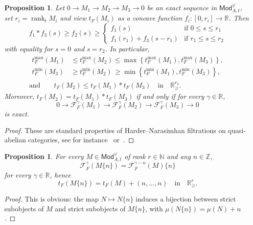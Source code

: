 \documentclass[11pt]{article}
\newtheorem{prop}[theo]{Proposition}
\theoremstyle{definition}
\numberwithin{equation}{section}
\numberwithin{figure}{section}
\numberwithin{table}{section}
\newcommand{\Mod}{\mathsf{Mod}}
\DeclareMathOperator{\rank}{rank}
\begin{document}
\begin{prop}\label{prop:ExactSeqInModt}
Let $0\rightarrow M_{1}\rightarrow M_{2}\rightarrow M_{3}\rightarrow0$ be an exact sequence in $\Mod_{A,t}^{\varphi}$, set $r_{i}=\rank_{t}M_{i}$ and view $t_{F}(M_{i})$ as a concave function $f_{i}:[0,r_{i}]\rightarrow\mathbb{R}$. Then
\[
f_{1}\ast f_{3}(s)\geq f_{2}(s)\geq
\begin{cases}
f_{1}(s) & \text{if }0\leq s\leq r_{1}\\
f_{1}(r_{1})+f_{3}(s-r_{1}) & \text{if }r_{1}\leq s\leq r_{2}
\end{cases}
\]
with equality for $s=0$ and $s=r_{2}$. In particular,
\begin{gather*}
\begin{aligned}
t_{F}^{\max}(M_{1}) & \leq t_{F}^{\max}(M_{2}) \leq \max\left\{ t_{F}^{\max}(M_{1}),t_{F}^{\max}(M_{3})\right\},\\
t_{F}^{\min}(M_{3}) & \geq t_{F}^{\min}(M_{2})\, \geq \min\left\{ t_{F}^{\min}(M_{1}),t_{F}^{\min}(M_{3})\right\},
\end{aligned}
\\
\text{and}\qquad t_{F}(M_{2})\leq t_{F}(M_{1})\ast t_{F}(M_{3})\quad\text{in}\quad\mathbb{R}_{\geq}^{r_{2}}.
\end{gather*}
Moreover, $t_{F}(M_{2})=t_{F}(M_{1})\ast t_{F}(M_{3})$ if and only if for every $\gamma\in\mathbb{R}$,
\[
0\rightarrow\mathcal{F}_{F}^{\gamma}(M_{1})\rightarrow\mathcal{F}_{F}^{\gamma}(M_{2})\rightarrow\mathcal{F}_{F}^{\gamma}(M_{3})\rightarrow0
\]
is exact.
\end{prop}

\begin{proof}
These are standard properties of Harder--Narasimhan filtrations on quasi-abelian categories, see for instance~\cite[Proposition~21]{Co16} or~\cite[4.4.4]{An09}.
\end{proof}

\begin{prop}\label{prop:tF(twist)onModt}
For every $M\in\Mod_{A,t}^{\varphi}$ of rank $r\in\mathbb{N}$ and any $n\in\mathbb{Z}$,
\[
\mathcal{F}_{F}^{\gamma}(M\{n\})=\mathcal{F}_{F}^{\gamma-n}(M)\{n\}
\]
for every $\gamma\in\mathbb{R}$, hence
\[
t_{F}(M\{n\})=t_{F}(M)+(n,\dots,n)\quad\text{in}\quad\mathbb{R}_{\geq}^{r}.
\]
\end{prop}

\begin{proof}
This is obvious: the map $N\mapsto N\{n\}$ induces a bijection between strict subobjects of $M$ and strict subobjects of $M\{n\}$, with $\mu(N\{n\})=\mu(N)+n$.
\end{proof}
\end{document}
